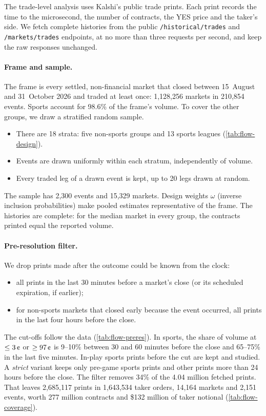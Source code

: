 The trade-level analysis uses Kalshi's public trade prints. Each print records the time to the
microsecond, the number of contracts, the YES price and the taker's side. We fetch complete
histories from the public \texttt{/historical/trades} and \texttt{/markets/trades} endpoints,
at no more than three requests per second, and keep the raw responses unchanged.

\paragraph{Frame and sample.} The frame is every settled, non-financial market that closed
between 15~August and 31~October 2026 and traded at least once: 1,128,256 markets in 210,854
events. Sports account for 98.6\% of the frame's volume. To cover the other groups, we draw a
stratified random sample.
\begin{itemize}
  \item There are 18 strata: five non-sports groups and 13 sports leagues
  (\cref{tab:flow-design}).
  \item Events are drawn uniformly within each stratum, independently of volume.
  \item Every traded leg of a drawn event is kept, up to 20 legs drawn at random.
\end{itemize}
The sample has 2,300 events and 15,329 markets. Design weights $\omega$ (inverse inclusion
probabilities) make pooled estimates representative of the frame. The histories are complete:
for the median market in every group, the contracts printed equal the reported volume.

\paragraph{Pre-resolution filter.} We drop prints made after the outcome could be known from the
clock:
\begin{itemize}
  \item all prints in the last 30 minutes before a market's close (or its scheduled expiration,
  if earlier);
  \item for non-sports markets that closed early because the event occurred, all prints in the
  last four hours before the close.
\end{itemize}
The cut-offs follow the data (\cref{tab:flow-preres}). In sports, the share of volume at
$\le3\cents$ or $\ge97\cents$ is 9--10\% between 30 and 60 minutes before the close and 65--75\%
in the last five minutes. In-play sports prints before the cut are kept and studied. A
\emph{strict} variant keeps only pre-game sports prints and other prints more than 24 hours
before the close. The filter removes 34\% of the 4.04 million fetched prints. That leaves
2,685,117 prints in 1,643,534 taker orders, 14,164 markets and 2,151 events, worth 277 million
contracts and \$132 million of taker notional (\cref{tab:flow-coverage}).

